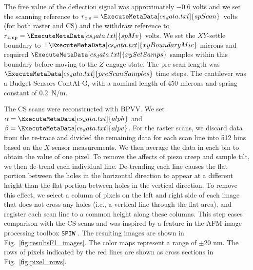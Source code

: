 \documentclass[journal]{IEEEtran}
\newcommand{\xc}{\ensuremath{X}\xspace}
\newcommand{\rzup}{\ensuremath{r_{z,\textrm{up}}}\xspace}
\newcommand{\rzs}{\ensuremath{r_{z,\textrm{s}}}\xspace}
\newcommand{\scanD}[1]{\ExecuteMetaData[cs_data.txt]{#1}}
\begin{document}
The free value of the deflection signal was approximately $-0.6$ volts
and we set the scanning reference to ${\rzs=\scanD{spScan}}$~volts
(for both raster and CS) and the withdraw reference to
${\rzup=\scanD{spMv}}$ volts. We set the $XY$-settle boundary to
$\pm \scanD{xyBoundaryMic}$ microns and required $\scanD{xySetSamps}$
samples within this boundary before moving to the $Z$-engage state.
The pre-scan length was $\scanD{preScanSamples}$ time steps. The
cantilever was a Budget Sensors ContAI-G, with a nominal length of 450
microns and spring constant of $0.2$~N/m.

The CS scans were reconstructed with BPVV. We set
${\alpha=\scanD{alph}}$ and ${\beta=\scanD{alpv}}$. For the
raster scans, we discard data from the re-trace and divided the
remaining data for each scan line into 512 bins based on the \xc
sensor measurements. We then average the data in each bin to obtain
the value of one pixel. To remove the affects of piezo creep and
sample tilt, we then de-trend each individual line. De-trending each
line causes the flat portion between the holes in the horizontal
direction to appear at a different height than the flat portion
between holes in the vertical direction. To remove this effect, we
select a column of pixels on the left and right side of each image
that does not cross any holes (i.e., a vertical line through the flat
area), and register each scan line to a common height along these columns.
This step eases comparison with the CS scans and was inspired by a
feature in the AFM image processing toolbox \texttt{SPIW} \cite{spiw}.
The resulting images are shown in Fig.~\ref{fig:resultsF1_images}. The
color maps represent a range of $\pm$20 nm. The rows of pixels
indicated by the red lines are shown as cross sections in
Fig.~\ref{fig:pixel_rows}.
\end{document}

